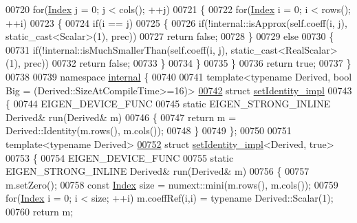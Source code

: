 \begin{DoxyCode}
00720   \textcolor{keywordflow}{for}(\hyperlink{namespace_eigen_a62e77e0933482dafde8fe197d9a2cfde}{Index} j = 0; j < cols(); ++j)
00721   \{
00722     \textcolor{keywordflow}{for}(\hyperlink{namespace_eigen_a62e77e0933482dafde8fe197d9a2cfde}{Index} i = 0; i < rows(); ++i)
00723     \{
00724       \textcolor{keywordflow}{if}(i == j)
00725       \{
00726         \textcolor{keywordflow}{if}(!internal::isApprox(\textcolor{keyword}{self}.coeff(i, j), static\_cast<Scalar>(1), prec))
00727           \textcolor{keywordflow}{return} \textcolor{keyword}{false};
00728       \}
00729       \textcolor{keywordflow}{else}
00730       \{
00731         \textcolor{keywordflow}{if}(!internal::isMuchSmallerThan(\textcolor{keyword}{self}.coeff(i, j), static\_cast<RealScalar>(1), prec))
00732           \textcolor{keywordflow}{return} \textcolor{keyword}{false};
00733       \}
00734     \}
00735   \}
00736   \textcolor{keywordflow}{return} \textcolor{keyword}{true};
00737 \}
00738 
00739 \textcolor{keyword}{namespace }\hyperlink{namespaceinternal}{internal} \{
00740 
00741 \textcolor{keyword}{template}<\textcolor{keyword}{typename} Derived, \textcolor{keywordtype}{bool} Big = (Derived::SizeAtCompileTime>=16)>
\hyperlink{struct_eigen_1_1internal_1_1set_identity__impl}{00742} \textcolor{keyword}{struct} \hyperlink{struct_eigen_1_1internal_1_1set_identity__impl}{setIdentity\_impl}
00743 \{
00744   EIGEN\_DEVICE\_FUNC
00745   \textcolor{keyword}{static} EIGEN\_STRONG\_INLINE Derived& run(Derived& m)
00746   \{
00747     \textcolor{keywordflow}{return} m = Derived::Identity(m.rows(), m.cols());
00748   \}
00749 \};
00750 
00751 \textcolor{keyword}{template}<\textcolor{keyword}{typename} Derived>
\hyperlink{struct_eigen_1_1internal_1_1set_identity__impl_3_01_derived_00_01true_01_4}{00752} \textcolor{keyword}{struct }\hyperlink{struct_eigen_1_1internal_1_1set_identity__impl}{setIdentity\_impl}<Derived, true>
00753 \{
00754   EIGEN\_DEVICE\_FUNC
00755   \textcolor{keyword}{static} EIGEN\_STRONG\_INLINE Derived& run(Derived& m)
00756   \{
00757     m.setZero();
00758     \textcolor{keyword}{const} \hyperlink{namespace_eigen_a62e77e0933482dafde8fe197d9a2cfde}{Index} size = numext::mini(m.rows(), m.cols());
00759     \textcolor{keywordflow}{for}(\hyperlink{namespace_eigen_a62e77e0933482dafde8fe197d9a2cfde}{Index} i = 0; i < size; ++i) m.coeffRef(i,i) = \textcolor{keyword}{typename} Derived::Scalar(1);
00760     \textcolor{keywordflow}{return} m;

\end{DoxyCode}

